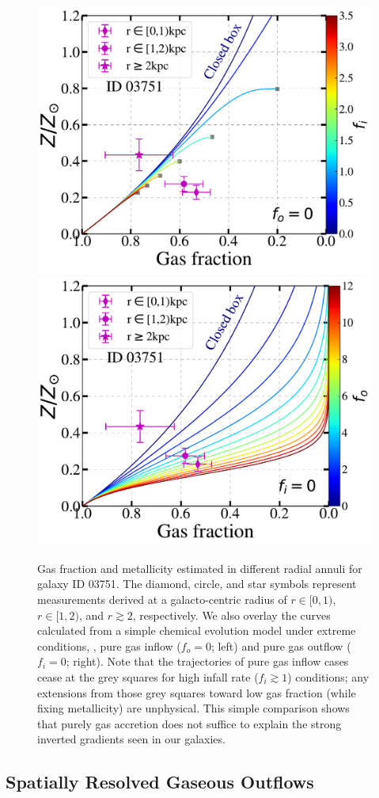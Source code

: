 \begin{figure}
    \includegraphics[width=.5\textwidth]{fig/Zerb_fgas_fixf_o.pdf}
    \includegraphics[width=.5\textwidth]{fig/Zerb_fgas_fixf_i.pdf}
    \caption[Gas fraction and metallicity estimated in different radial annuli.]
    {Gas fraction and metallicity estimated in different radial annuli for galaxy ID 03751.
    The diamond, circle, and star symbols represent measurements derived at a galacto-centric radius of $r\in[0,1)$\kpc,
    $r\in[1,2)$\kpc, and $r\gtrsim2$\kpc, respectively.
    We also overlay the curves calculated from a simple chemical evolution model \cite{Erb:2008di} under extreme conditions, \ie,
    pure gas inflow ($f_o=0$; left) and pure gas outflow ($f_i=0$; right).
    Note that the trajectories of pure gas inflow cases cease at the grey squares for high infall rate ($f_i\gtrsim1$) conditions;
    any extensions from those grey squares toward low gas fraction (while fixing metallicity) are unphysical.
    This simple comparison shows that purely gas accretion does not suffice to explain the strong inverted gradients seen in our
    galaxies.
    \label{fig:Zerb_fgas}}
\end{figure}

\subsection{Spatially Resolved Gaseous Outflows}\label{sect:regulator}

